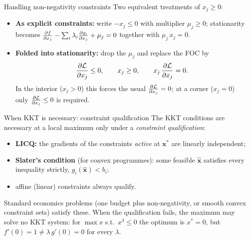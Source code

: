 \begin{rulebox}{Handling non-negativity constraints}
Two equivalent treatments of $x_j \geq 0$:
\begin{itemize}[leftmargin=1.6em,itemsep=0.3ex]
  \item \textbf{As explicit constraints:} write $-x_j \leq 0$ with
        multiplier $\mu_j \geq 0$; stationarity becomes
        $\frac{\partial f}{\partial x_j} - \sum_i \lambda_i \frac{\partial g_i}{\partial x_j} + \mu_j = 0$
        together with $\mu_j\,x_j = 0$.
  \item \textbf{Folded into stationarity:} drop the $\mu_j$ and replace the
        FOC by
        \[
          \frac{\partial \mathcal{L}}{\partial x_j} \leq 0, \qquad x_j \geq 0, \qquad
          x_j\,\frac{\partial \mathcal{L}}{\partial x_j} = 0 .
        \]
        In the interior ($x_j > 0$) this forces the usual
        $\frac{\partial \mathcal{L}}{\partial x_j} = 0$; at a corner ($x_j = 0$) only
        $\frac{\partial \mathcal{L}}{\partial x_j} \leq 0$ is required.
\end{itemize}
\end{rulebox}

\begin{rulebox}{When KKT is necessary: constraint qualification}
The KKT conditions are necessary at a local maximum only under a
\emph{constraint qualification}:
\begin{itemize}[leftmargin=1.6em,itemsep=0.3ex]
  \item \textbf{LICQ:} the gradients of the constraints \emph{active} at
        $\mathbf{x}^*$ are linearly independent;
  \item \textbf{Slater's condition} (for convex programmes): some feasible
        $\hat{\mathbf{x}}$ satisfies every inequality strictly,
        $g_i(\hat{\mathbf{x}}) < b_i$;
  \item affine (linear) constraints always qualify.
\end{itemize}
Standard economics problems (one budget plus non-negativity, or smooth
convex constraint sets) satisfy these. When the qualification fails, the
maximum may solve no KKT system: for $\max x$ s.t.\ $x^3 \leq 0$ the
optimum is $x^* = 0$, but $f'(0) = 1 \neq \lambda\,g'(0) = 0$ for every
$\lambda$.
\end{rulebox}

